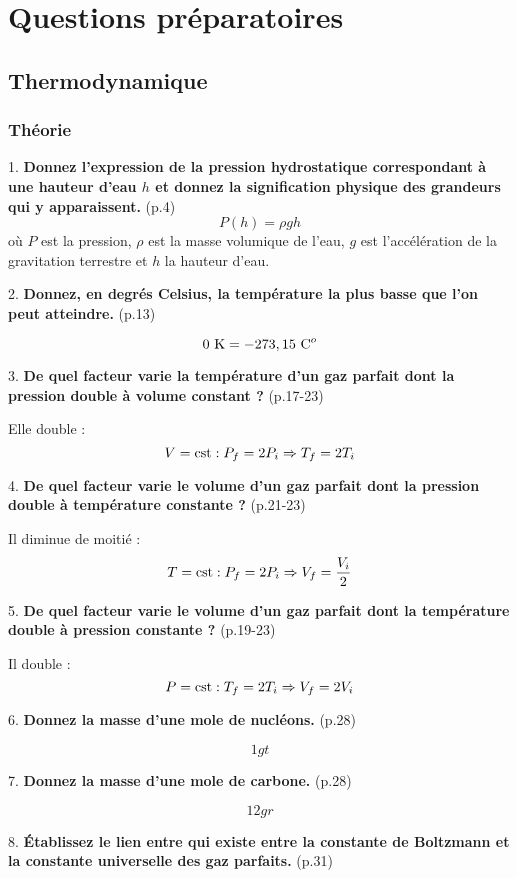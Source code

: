 \documentclass[british,french,11pt, a4paper, openany]{book}
\begin{document}
		
		
		
		
		
		
		
		
		\chapter{Questions préparatoires}
		\section{Thermodynamique}
		\newcommand{\quest}[3]{#1. \textbf{#3} (p.#2)}
		\subsection{Théorie}
		\quest{1}{4}{Donnez l'expression de la pression hydrostatique correspondant à une hauteur d'eau $h$ et donnez la signification physique des grandeurs qui y apparaissent.}
		$$P(h) = \rho g h$$ où $P$ est la pression, $\rho$ est la masse volumique de l’eau, $g$ est l’accélération de la gravitation terrestre et $h$ la hauteur d’eau.
			
		\quest{2}{13}{Donnez, en degrés Celsius, la température la plus basse que l'on peut atteindre.}
			
		$$0\ \text K = -273,15\ \text C^o$$
			
		\quest{3}{17-23}{De quel facteur varie la température d'un gaz parfait dont la pression double à volume constant ?}
			
		Elle double : $$V = \text{cst} : P_f = 2P_i \Rightarrow T_f = 2T_i $$
			
		\quest{4}{21-23}{De quel facteur varie le volume d'un gaz parfait dont la pression double à température constante ?}
			
		Il diminue de moitié : $$T = \text{cst} : P_f = 2P_i \Rightarrow V_f = \frac{V_i}{2} $$
			
		\quest{5}{19-23}{De quel facteur varie le volume d'un gaz parfait dont la température double à pression constante ?}
			
		Il double : $$P = \text{cst} : T_f = 2T_i \Rightarrow V_f = 2V_i $$
			
		\quest{6}{28}{Donnez la masse d'une mole de nucléons.}
			
		$$ 1 gt $$
			
		\quest{7}{28}{Donnez la masse d'une mole de carbone.}
			
		$$ 12 gr $$
			
			
		\quest{8}{31}{Établissez le lien entre qui existe entre la constante de Boltzmann et la constante universelle des gaz parfaits.}
			
\end{document}
